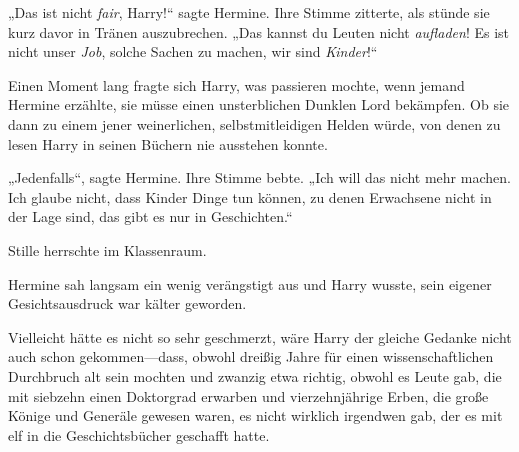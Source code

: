 „Das ist nicht \emph{fair}, Harry!“ sagte Hermine. Ihre Stimme zitterte, als stünde sie kurz davor in Tränen auszubrechen. „Das kannst du Leuten nicht \emph{aufladen}! Es ist nicht unser \emph{Job}, solche Sachen zu machen, wir sind \emph{Kinder}!“

Einen Moment lang fragte sich Harry, was passieren mochte, wenn jemand Hermine erzählte, sie müsse einen unsterblichen Dunklen Lord bekämpfen. Ob sie dann zu einem jener weinerlichen, selbstmitleidigen Helden würde, von denen zu lesen Harry in seinen Büchern nie ausstehen konnte.

„Jedenfalls“, sagte Hermine. Ihre Stimme bebte. „Ich will das nicht mehr machen. Ich glaube nicht, dass Kinder Dinge tun können, zu denen Erwachsene nicht in der Lage sind, das gibt es nur in Geschichten.“

Stille herrschte im Klassenraum.

Hermine sah langsam ein wenig verängstigt aus und Harry wusste, sein eigener Gesichtsausdruck war kälter geworden.

Vielleicht hätte es nicht so sehr geschmerzt, wäre Harry der gleiche Gedanke nicht auch schon gekommen—dass, obwohl dreißig Jahre für einen wissenschaftlichen Durchbruch alt sein mochten und zwanzig etwa richtig, obwohl es Leute gab, die mit siebzehn einen Doktorgrad erwarben und vierzehnjährige Erben, die große Könige und Generäle gewesen waren, es nicht wirklich irgendwen gab, der es mit elf in die Geschichtsbücher geschafft hatte.

